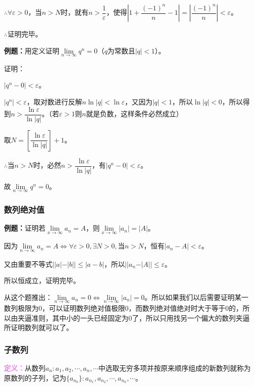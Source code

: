 \documentclass[UTF8, 12pt]{ctexart}
\begin{document}
    $\therefore\forall\varepsilon>0$，当$n>N$时，就有$n>\dfrac{1}{\varepsilon}$，使得$\left\vert 1+\dfrac{(-1)^n}{n}-1\right\vert=\left\vert\dfrac{(-1)^n}{n}\right\vert<\varepsilon$。

    $\therefore$证明完毕。

    \textbf{例题：}用定义证明$\lim\limits_{n\to\infty}q^n=0$（$q$为常数且$\vert q\vert<1$）。

    证明：

    $\vert q^n-0\vert<\varepsilon$。

    $\vert q^n\vert<\varepsilon$，取对数进行反解$n\ln\vert q\vert<\ln\varepsilon$，又因为$\vert q\vert<1$，所以$\ln\vert q\vert<0$，所以得到$n>\dfrac{\ln\varepsilon}{\ln\vert q\vert}$。（若$\varepsilon>1$则$n$就是负数，这样条件必然成立）

    取$N=\left[\dfrac{\ln\varepsilon}{\ln\vert q\vert}\right]+1$。

    $\therefore$当$n>N$时，必然$n>\dfrac{\ln\varepsilon}{\ln\vert q\vert}$，有$\vert q^n-0\vert<\varepsilon$。

    故$\lim\limits_{n\to\infty}q^n=0$。

    \subsubsection{数列绝对值}

    \textbf{例题：}证明若$\lim\limits_{x\to\infty}a_n=A$，则$\lim\limits_{x\to\infty}\vert a_n\vert=\vert A\vert$。

    因为$\lim\limits_{n\to\infty}a_n=A\Leftrightarrow\forall\varepsilon>0,\exists N>0,\text{当}n>N$，恒有$\vert a_n-A\vert<\varepsilon$。

    又由重要不等式$\vert\vert a\vert-\vert b\vert\vert\leqslant\vert a-b\vert$，所以$\vert\vert a_n-\vert A\vert\vert\leqslant\varepsilon$。

    所以恒成立，证明完毕。

    从这个题推出：$\lim\limits_{n\to\infty}a_n=0\Leftrightarrow\lim\limits_{n\to\infty}\vert a_n\vert=0$。所以如果我们以后需要证明某一数列极限为0，可以证明数列绝对值极限0，而数列绝对值绝对时大于等于0的，所以由夹逼准则，其中小的一头已经固定为0了，所以只用找另一个偏大的数列夹逼所证明数列就可以了。

    \subsubsection{子数列}

    \textcolor{violet}{\textbf{定义：}}从数列${a_n}:a_1,a_2,\cdots,a_n,\cdots$中选取无穷多项并按原来顺序组成的新数列就称为原数列的子列，记为$\{a_{n_k}\}:a_{n_1},a_{n_2},\cdots,a_{n_k},\cdots$。
\end{document}
